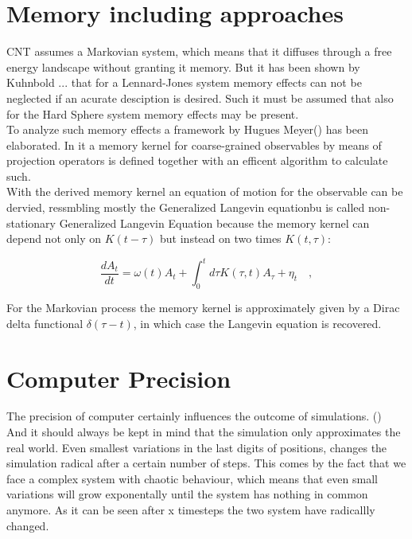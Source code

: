 \section{Memory including approaches}
\label{sec:memory_approach}
CNT assumes a Markovian system, which means that it diffuses through a free energy landscape without granting it memory. But it has been shown by Kuhnbold ...  that for a Lennard-Jones system memory effects can not be neglected if an acurate  desciption is desired. Such it must be assumed that also for the Hard Sphere system memory effects may be present.\\

To analyze such memory effects a framework by Hugues Meyer() has been elaborated. In it a memory kernel for coarse-grained observables by means of projection operators is defined together with an efficent algorithm to calculate such.\\
With the derived memory kernel an equation of motion for the observable can be dervied, ressmbling mostly the Generalized Langevin equationbu is called non-stationary Generalized Langevin Equation because the memory kernel can depend not only on $K(t-\tau)$ but instead on two times $K(t,\tau)$:

\begin{equation}
\label{eqn:EOM_A}
  \frac{d A_{t}}{dt} = \omega (t) A_{t} + \int_{0}^{t} d\tau  K(\tau, t) A_{\tau} + \eta_{t} \quad ,
\end{equation}

For the Markovian process the memory kernel is approximately given by a Dirac delta functional $\delta(\tau-t)$, in which case the Langevin equation is recovered.


\section{Computer Precision}
\label{sec:precision}
The precision of computer certainly influences the outcome of simulations. ()\\
And it should always be kept in mind that the simulation only approximates the real world. Even smallest variations in the last digits of positions, changes the simulation radical after a certain number of steps. This comes by the fact that we face a complex system with chaotic behaviour, which means that even small variations will grow exponentally until the system has nothing in common anymore.  
As it can be seen after x timesteps the two system have radicallly changed.

